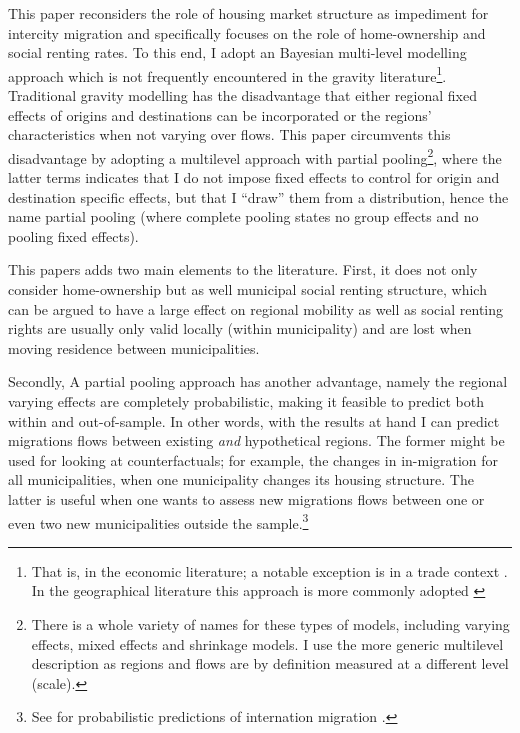 \documentclass[fleqn,10pt]{SelfArx} %
\begin{document}
        This paper reconsiders the role of housing market structure as impediment for intercity migration and specifically focuses on the role of home-ownership and social renting rates. To this end, I adopt an Bayesian multi-level
        modelling approach which is not frequently encountered in the
        gravity literature\footnote{That is, in the economic literature; a notable exception is in a trade
        context \citet{ranjan2007bayesian}. In the geographical literature this approach is more commonly adopted \citep[see within a migration context][]{congdon2010random, congdon2012spatial}}. Traditional gravity modelling
        has the disadvantage that either regional fixed effects of
        origins and destinations can be incorporated or the regions'
        characteristics when not varying over flows. This paper circumvents this disadvantage by adopting a
        multilevel approach with partial pooling\footnote{There is a
        whole variety of names for these types of models, including
        varying effects, mixed effects and shrinkage models. I use
        the more generic multilevel description as regions and flows
        are by definition measured at a different level (scale).},
        where the latter terms indicates that I do not impose fixed effects to control for
        origin and destination specific effects, but that I ``draw''
        them from a distribution, hence the name partial pooling
        (where complete pooling states no group effects and no pooling
        fixed effects).
               
        This papers adds two main elements to the
        literature. First, it does not only consider home-ownership
        but as well municipal social renting structure, which can be
        argued \citep[see, e.g.,][]{boyle1998migration, hughes1981council} to have a large effect on regional mobility as well as
        social renting rights are usually only valid locally (within
        municipality) and are lost when moving residence between
        municipalities.
        
        Secondly, A partial pooling approach has another advantage, namely the
        regional varying effects are completely probabilistic, making
        it feasible to predict both within and out-of-sample. In other
        words, with the results at hand I can predict migrations flows between
        existing \emph{and} hypothetical regions. The former might be used for looking at counterfactuals; for example, the changes in in-migration for all municipalities, when one municipality changes its housing structure. The latter is useful when one wants to assess new migrations flows between one or even two new municipalities outside the sample.\footnote{See for probabilistic predictions of internation migration \cite{azose2015bayesian}.}
\end{document}
